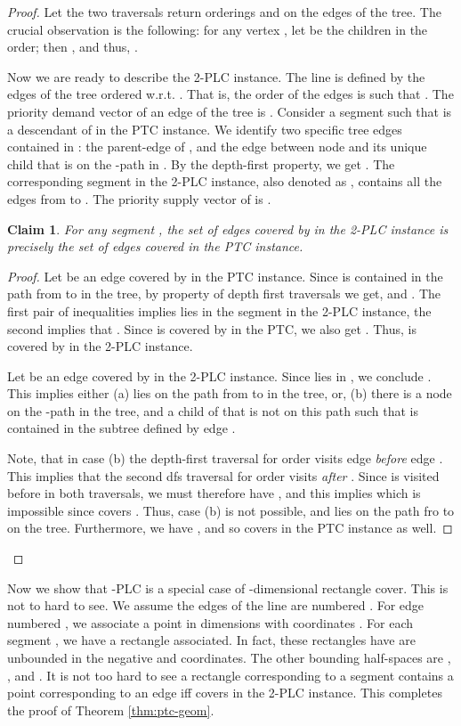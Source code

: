 \documentclass[11pt]{article}
\newtheorem{claim}{Claim}
\newcommand{\1}{\mathbb{1}}
\begin{document}
{\begin{proof}
  Let the two traversals return orderings  and  on the
  edges of the tree. The crucial observation is the following: for any
  vertex , let  be the children in the 
  order; then , and
  thus, .

  Now we are ready to describe the 2-PLC instance. The line is defined
  by the edges of the tree ordered w.r.t. .  That is, the order
  of the edges is  such that .  The priority demand vector of an edge  of
  the tree is . Consider a segment  such
  that  is a descendant of  in the PTC instance. We identify two
  specific tree edges contained in : the parent-edge
   of , and the edge  between node  and its 
  unique child  that is on the -path in .
  By the depth-first property, we get .
  The corresponding segment in the 2-PLC instance, also denoted as
  , contains all the edges from  to . The
  priority supply vector of  is .

\begin{claim}
  For any segment , the set of edges covered by  in the 2-PLC
  instance is precisely the set of edges covered in the PTC instance.
\end{claim}
\begin{proof}
  Let  be an edge covered by  in the PTC instance. Since  is
  contained in the path from  to  in the tree, by property of
  depth first traversals we get,  and .  The first pair of
  inequalities implies  lies in the segment  in the 2-PLC
  instance, the second implies that . Since  is
  covered by  in the PTC, we also get . Thus,  is covered by  in the 2-PLC instance.

  Let  be an edge covered by  in the 2-PLC instance. Since 
  lies in , we conclude . This
  implies either (a)  lies on the path from  to  in the tree,
  or, (b) there is a node  on the -path in the tree, and a
  child  of  that is not on this path such that  is contained
  in the subtree defined by edge . 
  
  Note, that in case (b) the depth-first traversal for order 
  visits edge  {\em before} edge . This implies that 
  the second dfs traversal for order 
  visits  {\em after} . Since  is visited before
   in both traversals, we must therefore have
  , and this implies  which is impossible since  covers . Thus, case (b)
  is not possible, and  lies on the path fro  to  on the
  tree.  Furthermore, we have , and so
   covers  in the PTC instance as well. 
\end{proof}  
\end{proof}

Now we show that -PLC is a special case of -dimensional
rectangle cover. This is not to hard to see.  We assume the edges of
the line are numbered . For edge  numbered ,
we associate a point in  dimensions with coordinates
. For each segment , we have a
rectangle associated.  In fact, these rectangles have are unbounded in
the negative  and  coordinates. The other  bounding
half-spaces are , ,  and . It is not too hard to see a rectangle corresponding to a
segment  contains a point corresponding to an edge  iff 
covers  in the 2-PLC instance. This completes the proof of Theorem \ref{thm:ptc-geom}.
}
\end{document}
